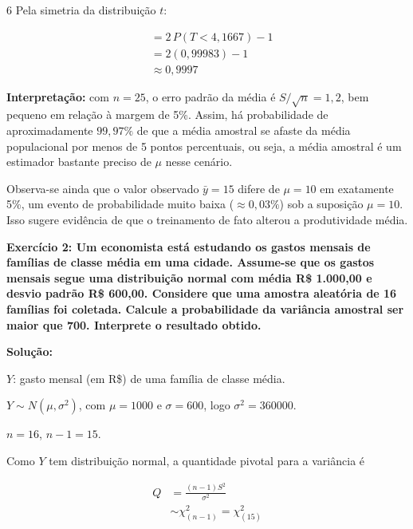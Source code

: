 \documentclass[8pt, a4paper, landscape]{extarticle}
\begin{document}
\begin{multicols}{6}
Pela simetria da distribuição $t$:

\begin{equation*}
\begin{split}
&= 2\,P(T < 4,1667) - 1 \\
&= 2(0,99983) - 1 \\
&\approx 0,9997
\end{split}
\end{equation*}

\textbf{Interpretação:} com $n = 25$, o erro padrão da média é $S/\sqrt{n} = 1,2$, bem pequeno em relação à margem de 5\%. Assim, há probabilidade de aproximadamente $99,97\%$ de que a média amostral se afaste da média populacional por menos de 5 pontos percentuais, ou seja, a média amostral é um estimador bastante preciso de $\mu$ nesse cenário.

Observa-se ainda que o valor observado $\bar{y} = 15$ difere de $\mu = 10$ em exatamente 5\%, um evento de probabilidade muito baixa ($\approx 0,03\%$) sob a suposição $\mu = 10$. Isso sugere evidência de que o treinamento de fato alterou a produtividade média.

\textbf{Exercício 2: Um economista está estudando os gastos mensais de famílias de classe média em uma cidade. Assume-se que os gastos mensais segue uma distribuição normal com média R\$ 1.000,00 e desvio padrão R\$ 600,00. Considere que uma amostra aleatória de 16 famílias foi coletada. Calcule a probabilidade da variância amostral ser maior que 700. Interprete o resultado obtido.}

\vspace{0.3cm}

\textbf{Solução:}

$Y$: gasto mensal (em R\$) de uma família de classe média.

$Y \sim N(\mu, \sigma^2)$, com $\mu = 1000$ e $\sigma = 600$, logo $\sigma^2 = 360000$.

$n = 16$, \quad $n - 1 = 15$.

Como $Y$ tem distribuição normal, a quantidade pivotal para a variância é

\begin{equation*}
\begin{split}
Q &= \frac{(n-1)S^2}{\sigma^2} \\
  &\sim \chi^2_{(n-1)} = \chi^2_{(15)}
\end{split}
\end{equation*}


\end{multicols}
\end{document}
